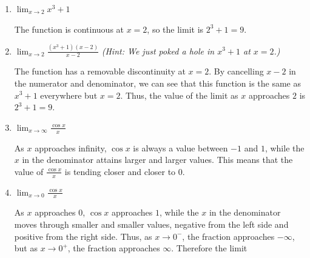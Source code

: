 \documentclass{article}
\begin{document}
\begin{enumerate}
\begin{enumerate}
    \item
      \begin{problem}[\vfill]
        $\displaystyle \lim_{x \to 2} x^3 + 1$
      \end{problem}

      \begin{solution}
        The function is continuous at $x=2$, so the limit is
        $2^3+1=\boxed{9.}$
      \end{solution}

    \item
      \begin{problem}[\vfill\newpage]
        $\displaystyle \lim_{x \to 2} \frac{(x^3 + 1)(x-2)}{x-2}$
        \emph{(Hint: We just poked a hole in $x^3 +1$ at $x=2$.)}
      \end{problem}

      \begin{solution}
        The function has a removable discontinuity at $x=2$. By cancelling
        $x-2$ in the numerator and denominator, we can see that this
        function is the same as $x^3 + 1$ everywhere but $x=2$. Thus, 
        the value of the limit as $x$ approaches $2$ is $2^3 + 1 =
        \boxed{9.}$
      \end{solution}

    \item
      \begin{problem}[\vfill]
        $\displaystyle \lim_{x \to \infty} \frac{\cos x}{x}$
      \end{problem}

      \begin{solution}
        As $x$ approaches infinity, $\cos x$ is always a value between
        $-1$ and $1$, while the $x$ in the denominator
        attains larger and larger values. This
        means that the value of $\frac{\cos x}{x}$ is tending closer
        and closer to $\boxed{0.}$
      \end{solution}

    \item
      \begin{problem}[\vfill]
        $\displaystyle \lim_{x \to 0} \frac{\cos x}{x}$
      \end{problem}

      \begin{solution}
        As $x$ approaches $0$, $\cos x$ approaches $1$, while the $x$
        in the denominator moves through smaller and smaller values,
        negative from the left side and positive from the right side.
        Thus, as $x \to 0^-$, the fraction approaches $-\infty$, but as
        $x \to 0^+$, the fraction approaches $\infty$. Therefore the
        limit 
      \end{solution}


\end{enumerate}
\end{enumerate}
\end{document}
